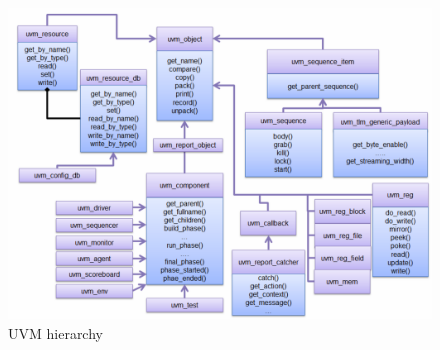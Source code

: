 \documentclass[../main.tex]{subfiles}
\begin{document}
\begin{figure}[h!]
\centering
\includegraphics[scale = 0.6]{diagrams/UVM_hirearchy.png}

\caption{UVM hierarchy\cite{accelera}}
\label{fig:uvm_hierarchy}
\end{figure}
\end{document}
